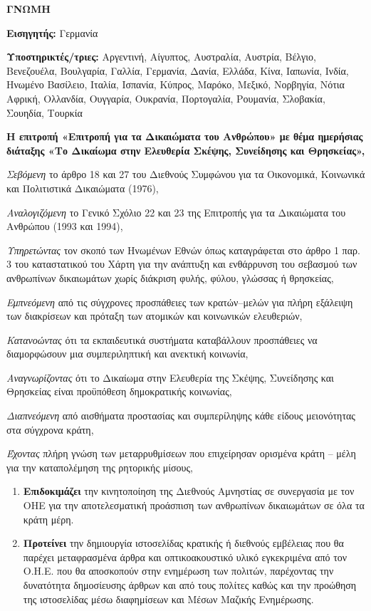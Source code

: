 \documentclass[12pt, letterpaper]{article}
\begin{document}
\pagestyle{fancy}
\fancyfoot{}
\renewcommand{\headrulewidth}{0pt}
\normalsize


\textbf{ΓΝΩΜΗ}

\textbf{Εισηγητής:} Γερμανία

\textbf{Υποστηρικτές/τριες:} Αργεντινή, Αίγυπτος, Αυστραλία, Αυστρία, Βέλγιο, Βενεζουέλα, Βουλγαρία, Γαλλία, Γερμανία, Δανία, Ελλάδα, Κίνα, Ιαπωνία, Ινδία, Ηνωμένο Βασίλειο, Ιταλία, Ισπανία, Κύπρος, Μαρόκο, Μεξικό, Νορβηγία, Νότια Αφρική, Ολλανδία, Ουγγαρία, Ουκρανία, Πορτογαλία, Ρουμανία, Σλοβακία, Σουηδία, Τουρκία

\textbf{Η επιτροπή «Επιτροπή για τα Δικαιώματα του Ανθρώπου» με θέμα ημερήσιας διάταξης «Το Δικαίωμα στην Ελευθερία Σκέψης, Συνείδησης και Θρησκείας»,}

\textit{Σεβόμενη} το άρθρο 18 και 27 του Διεθνούς Συμφώνου για τα Οικονομικά, Κοινωνικά και Πολιτιστικά Δικαιώματα (1976),

\textit{Αναλογιζόμενη} το Γενικό Σχόλιο 22 και 23 της Επιτροπής για τα Δικαιώματα του Ανθρώπου (1993 και 1994),

\textit{Υπηρετώντας} τον σκοπό των Ηνωμένων Εθνών όπως καταγράφεται στο άρθρο 1 παρ. 3 του καταστατικού του Χάρτη για την ανάπτυξη και ενθάρρυνση του σεβασμού των ανθρωπίνων δικαιωμάτων χωρίς διάκριση φυλής, φύλου, γλώσσας ή θρησκείας,

\textit{Εμπνεόμενη} από τις σύγχρονες προσπάθειες των κρατών–μελών για πλήρη εξάλειψη των διακρίσεων και πρόταξη των ατομικών και κοινωνικών ελευθεριών,

\textit{Κατανοώντας} ότι τα εκπαιδευτικά συστήματα καταβάλλουν προσπάθειες να διαμορφώσουν μια συμπεριληπτική και ανεκτική κοινωνία,

\textit{Αναγνωρίζοντας} ότι το Δικαίωμα στην Ελευθερία της Σκέψης, Συνείδησης και Θρησκείας είναι προϋπόθεση δημοκρατικής κοινωνίας,

\textit{Διαπνεόμενη} από αισθήματα προστασίας και συμπερίληψης κάθε είδους μειονότητας στα σύγχρονα κράτη,

\textit{Έχοντας} πλήρη γνώση των μεταρρυθμίσεων που επιχείρησαν ορισμένα κράτη – μέλη για την καταπολέμηση της ρητορικής μίσους,

\begin{enumerate}
  
  \item \textbf{Επιδοκιμάζει} την κινητοποίηση της Διεθνούς Αμνηστίας σε συνεργασία με τον ΟΗΕ για την αποτελεσματική προάσπιση των ανθρωπίνων δικαιωμάτων σε όλα τα κράτη μέρη.
  
  \item \textbf{Προτείνει} την δημιουργία ιστοσελίδας κρατικής ή διεθνούς εμβέλειας που θα παρέχει μεταφρασμένα άρθρα και οπτικοακουστικό υλικό εγκεκριμένα από τον Ο.Η.Ε. που θα αποσκοπούν στην ενημέρωση των πολιτών, παρέχοντας την δυνατότητα δημοσίευσης άρθρων και από τους πολίτες καθώς και την προώθηση της ιστοσελίδας μέσω διαφημίσεων και Μέσων Μαζικής Ενημέρωσης.
  
\end{enumerate}
\end{document}
